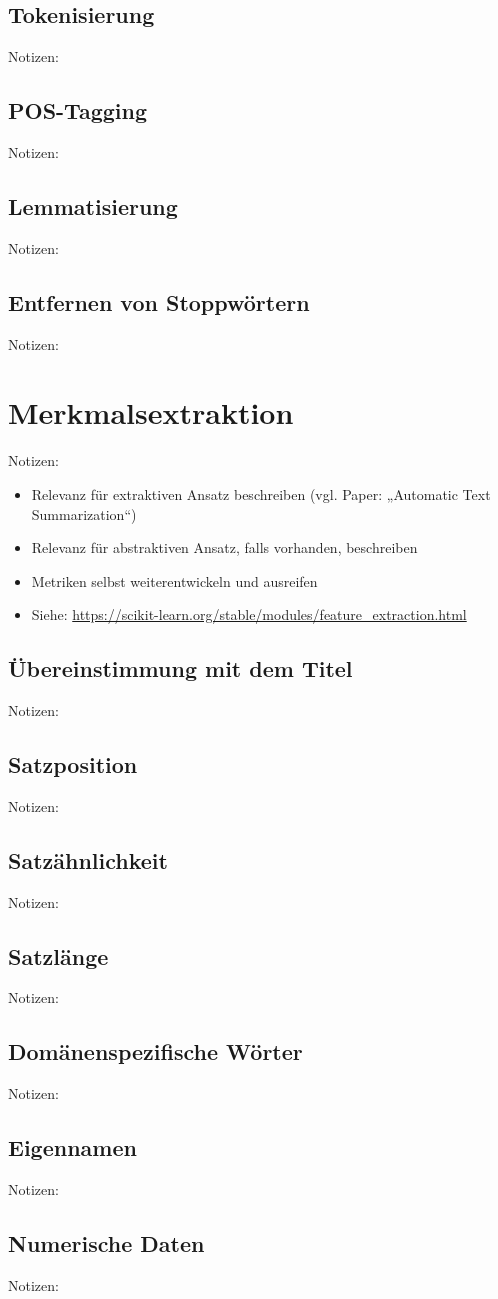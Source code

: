 \subsection{Tokenisierung}
Notizen:


\subsection{POS-Tagging}
Notizen:


\subsection{Lemmatisierung}
Notizen:


\subsection{Entfernen von Stoppwörtern}
Notizen:


\section{Merkmalsextraktion}
Notizen:
\begin{itemize}
	\item Relevanz für extraktiven Ansatz beschreiben (vgl. Paper: „Automatic Text Summarization“)
	\item Relevanz für abstraktiven Ansatz, falls vorhanden, beschreiben
	\item Metriken selbst weiterentwickeln und ausreifen
	\item Siehe: \url{https://scikit-learn.org/stable/modules/feature_extraction.html}
\end{itemize}


\subsection{Übereinstimmung mit dem Titel}
Notizen:


\subsection{Satzposition}
Notizen:


\subsection{Satzähnlichkeit}
Notizen:


\subsection{Satzlänge}
Notizen:


\subsection{Domänenspezifische Wörter}
Notizen:


\subsection{Eigennamen}
Notizen:


\subsection{Numerische Daten}
Notizen:
